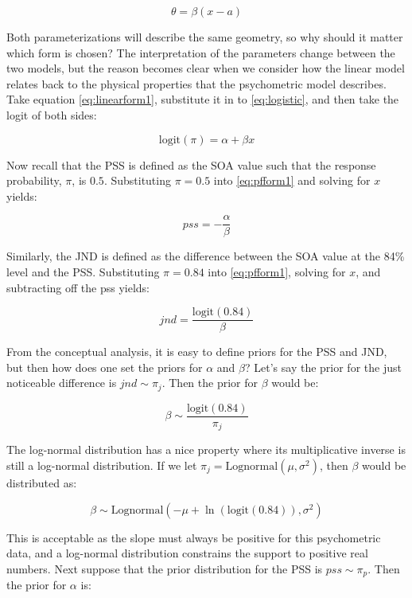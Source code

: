 \documentclass[11pt, oneside, openany]{scrbook}
\begin{document}
\begin{equation}
  \theta = \beta(x - a)
  \label{eq:linearform2}
\end{equation}

Both parameterizations will describe the same geometry, so why should it matter which form is chosen? The interpretation of the parameters change between the two models, but the reason becomes clear when we consider how the linear model relates back to the physical properties that the psychometric model describes. Take equation \eqref{eq:linearform1}, substitute it in to \eqref{eq:logistic}, and then take the logit of both sides:

\begin{equation}
  \mathrm{logit}(\pi) = \alpha+\beta x
  \label{eq:pfform1}
\end{equation}

Now recall that the PSS is defined as the SOA value such that the response probability, \(\pi\), is \(0.5\). Substituting \(\pi = 0.5\) into \eqref{eq:pfform1} and solving for \(x\) yields:

\[pss = -\frac{\alpha}{\beta}\]

Similarly, the JND is defined as the difference between the SOA value at the 84\% level and the PSS. Substituting \(\pi = 0.84\) into \eqref{eq:pfform1}, solving for \(x\), and subtracting off the pss yields:

\begin{equation}
  jnd = \frac{\mathrm{logit}(0.84)}{\beta}
  \label{eq:jnd1}
\end{equation}

From the conceptual analysis, it is easy to define priors for the PSS and JND, but then how does one set the priors for \(\alpha\) and \(\beta\)? Let's say the prior for the just noticeable difference is \(jnd \sim \pi_j\). Then the prior for \(\beta\) would be:

\[\beta \sim \frac{\mathrm{logit}(0.84)}{\pi_j}\]

The log-normal distribution has a nice property where its multiplicative inverse is still a log-normal distribution. If we let \(\pi_j = \mathrm{Lognormal}(\mu, \sigma^2)\), then \(\beta\) would be distributed as:

\[
\beta \sim \mathrm{Lognormal}(-\mu + \ln(\mathrm{logit}(0.84)), \sigma^2)
\]

This is acceptable as the slope must always be positive for this psychometric data, and a log-normal distribution constrains the support to positive real numbers. Next suppose that the prior distribution for the PSS is \(pss \sim \pi_p\). Then the prior for \(\alpha\) is:
\end{document}
